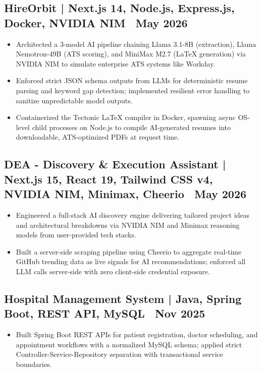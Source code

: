 \documentclass[11pt, a4paper]{article}
\begin{document}
\subsection*{HireOrbit | Next.js 14, Node.js, Express.js, Docker, NVIDIA NIM \textbar\ May 2026}
\begin{itemize}
\item Architected a 3-model AI pipeline chaining Llama 3.1-8B (extraction), Llama Nemotron-49B (ATS scoring), and MiniMax M2.7 (LaTeX generation) via NVIDIA NIM to simulate enterprise ATS systems like Workday.
\item Enforced strict JSON schema outputs from LLMs for deterministic resume parsing and keyword gap detection; implemented resilient error handling to sanitize unpredictable model outputs.
\item Containerized the Tectonic LaTeX compiler in Docker, spawning async OS-level child processes on Node.js to compile AI-generated resumes into downloadable, ATS-optimized PDFs at request time.
\end{itemize}

\subsection*{DEA - Discovery \& Execution Assistant | Next.js 15, React 19, Tailwind CSS v4, NVIDIA NIM, Minimax, Cheerio \textbar\ May 2026}
\begin{itemize}
\item Engineered a full-stack AI discovery engine delivering tailored project ideas and architectural breakdowns via NVIDIA NIM and Minimax reasoning models from user-provided tech stacks.
\item Built a server-side scraping pipeline using Cheerio to aggregate real-time GitHub trending data as live signals for AI recommendations; enforced all LLM calls server-side with zero client-side credential exposure.
\end{itemize}

\subsection*{Hospital Management System | Java, Spring Boot, REST API, MySQL \textbar\ Nov 2025}
\begin{itemize}
\item Built Spring Boot REST APIs for patient registration, doctor scheduling, and appointment workflows with a normalized MySQL schema; applied strict Controller-Service-Repository separation with transactional service boundaries.
\end{itemize}
\end{document}
